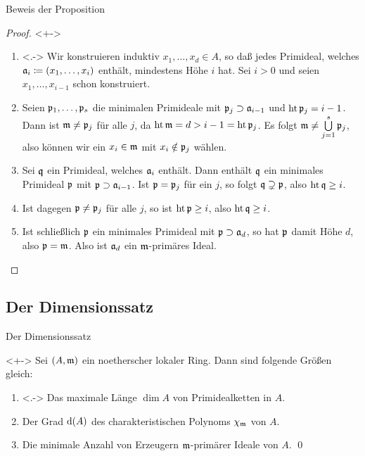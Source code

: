 \begin{frame}{Beweis der Proposition}
	\begin{proof}<+->
		\begin{enumerate}[<+->]
		\item<.->
			Wir konstruieren induktiv \(x_1, \dotsc, x_d \in A\), so daß jedes Primideal, welches
			\(\mathfrak{a}_i \coloneqq (x_1, \dotsc, x_i)\) enthält,
			mindestens Höhe \(i\) hat. Sei \(i > 0\) und seien \(x_1, \dotsc, x_{i - 1}\) schon konstruiert.
		\item
			Seien \(\mathfrak{p}_1, \dotsc, \mathfrak{p}_s\) die minimalen Primideale mit \(\mathfrak{p}_j \supset \mathfrak{a}_{i - 1}\) und
			\(\operatorname{ht} \mathfrak{p}_j = i - 1\).
			Dann ist \(\mathfrak{m} \neq \mathfrak{p}_j\) für alle \(j\), da \(\operatorname{ht} \mathfrak{m} = d > i - 1 = \operatorname{ht} \mathfrak{p}_j\).
			Es folgt \(\mathfrak{m} \neq \bigcup\limits_{j = 1}^s \mathfrak{p}_j\), also können wir ein \(x_i \in \mathfrak{m}\) mit
			\(x_i \notin \mathfrak{p}_j\) wählen.
		\item
			Sei \(\mathfrak{q}\) ein Primideal, welches \(\mathfrak{a}_i\) enthält. Dann enthält \(\mathfrak{q}\) ein minimales Primideal
			\(\mathfrak{p}\) mit \(\mathfrak{p} \supset \mathfrak{a}_{i - 1}\). Ist \(\mathfrak{p} = \mathfrak{p}_j\) für ein \(j\),
			so folgt \(\mathfrak{q} \supsetneq \mathfrak{p}\), also \(\operatorname{ht} \mathfrak{q} \ge i\).
		\item
			Ist dagegen \(\mathfrak{p} \neq \mathfrak{p}_j\) für alle \(j\), so ist \(\operatorname{ht} \mathfrak{p} \ge i\),
			also \(\operatorname{ht} \mathfrak{q} \ge i\).
		\item
			Ist schließlich \(\mathfrak{p}\) ein minimales Primideal mit \(\mathfrak{p} \supset \mathfrak{a}_d\), so hat \(\mathfrak{p}\) damit
			Höhe \(d\), also \(\mathfrak{p} = \mathfrak{m}\). Also ist \(\mathfrak{a}_d\) ein \(\mathfrak{m}\)-primäres Ideal.
			\qedhere
		\end{enumerate}
	\end{proof}
\end{frame}

\subsection{Der Dimensionssatz}

\begin{frame}{Der Dimensionssatz}
	\begin{theorem}[Dimensionssatz]<+->
		Sei \((A, \mathfrak{m})\) ein noetherscher lokaler Ring. Dann sind folgende Größen gleich:
		\begin{enumerate}[<+->]
		\item<.->
			Das maximale Länge \(\dim A\) von Primidealketten in \(A\).
		\item
			Der Grad \(\operatorname{d}(A)\) des charakteristischen Polynoms \(\chi_{\mathfrak{m}}\) von \(A\).
		\item
			Die minimale Anzahl von Erzeugern \(\mathfrak{m}\)-primärer Ideale von \(A\).
			\qed
		\end{enumerate}
	\end{theorem}
\end{frame}

